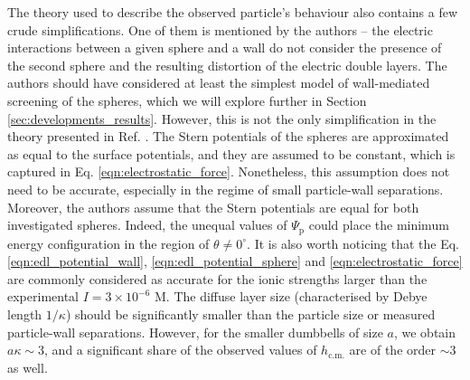 \documentclass{master_thesis}
\begin{document}
The theory used to describe the observed particle's behaviour also contains a few crude simplifications. One of them is mentioned by the authors -- the electric interactions between a given sphere and a wall do not consider the presence of the second sphere and the resulting distortion of the electric double layers. The authors should have considered at least the simplest model of wall-mediated screening of the spheres, which we will explore further in Section \ref{sec:developments_results}. However, this is not the only simplification in the theory presented in Ref. \cite{verweij2021}. The Stern potentials of the spheres are approximated as equal to the surface potentials, and they are assumed to be constant, which is captured in Eq. \eqref{eqn:electrostatic_force}. Nonetheless, this assumption does not need to be accurate, especially in the regime of small particle-wall separations. Moreover, the authors assume that the Stern potentials are equal for both investigated spheres. Indeed, the unequal values of $\Psi_\textrm{p}$ could place the minimum energy configuration in the region of $\theta \neq 0^{\circ}$. It is also worth noticing that the Eq. \eqref{eqn:edl_potential_wall}, \eqref{eqn:edl_potential_sphere} and \eqref{eqn:electrostatic_force} are commonly considered as accurate for the ionic strengths larger than the experimental $I=3\times 10^{-6}$ M. The diffuse layer size (characterised by Debye length $1/\kappa$) should be significantly smaller than the particle size or measured particle-wall separations. However, for the smaller dumbbells of size $a$, we obtain $a \kappa \sim 3$, and a significant share of the observed values of $h_{\textrm{c.m.}}$ are of the order $\sim 3$ as well.
\end{document}
